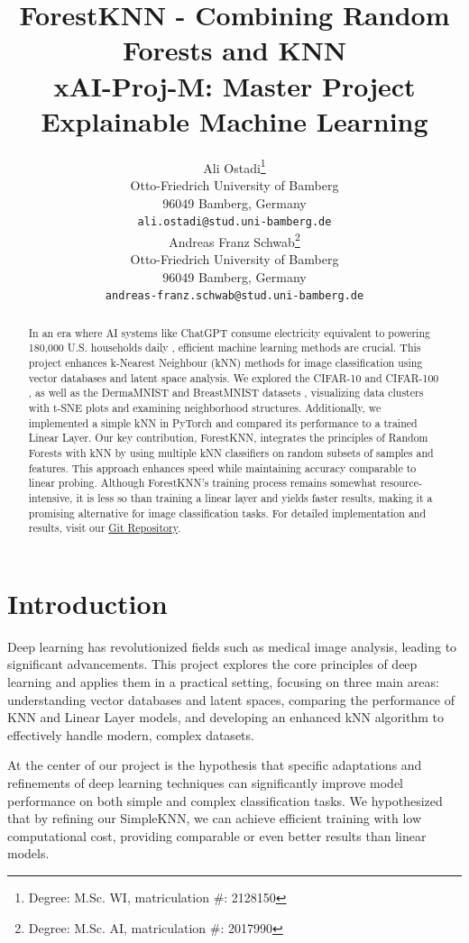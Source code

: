 \documentclass[a4paper]{article}
\title{ForestKNN - Combining Random Forests and KNN\\ {\large xAI-Proj-M: Master Project Explainable Machine Learning }}
\author{%
  Ali Ostadi\thanks{Degree: M.Sc. WI, matriculation \#: 2128150} \\
  Otto-Friedrich University of Bamberg\\
  96049 Bamberg, Germany\\
  \texttt{ali.ostadi@stud.uni-bamberg.de}\\
   \And
   Andreas Franz Schwab\thanks{Degree: M.Sc. AI, matriculation \#: 2017990}\\
   Otto-Friedrich University of Bamberg\\
   96049 Bamberg, Germany\\
   \texttt{andreas-franz.schwab@stud.uni-bamberg.de} \\
}
\begin{document}
\maketitle
\def\va{{\bm{a}}}

\begin{abstract}
In an era where AI systems like ChatGPT consume electricity equivalent to powering 180,000 U.S. households daily \citep{Gordon2024}, efficient machine learning methods are crucial. This project enhances k-Nearest Neighbour (kNN) methods for image classification using vector databases and latent space analysis. We explored the CIFAR-10 and CIFAR-100 \citep{Krizhevsky2009}, as well as the DermaMNIST and BreastMNIST datasets \citep{medmnistv1, medmnistv2}, visualizing data clusters with t-SNE plots and examining neighborhood structures. Additionally, we implemented a simple kNN in PyTorch and compared its performance to a trained Linear Layer.
Our key contribution, ForestKNN, integrates the principles of Random Forests with kNN by using multiple kNN classifiers on random subsets of samples and features. This approach enhances speed while maintaining accuracy comparable to linear probing. Although ForestKNN's training process remains somewhat resource-intensive, it is less so than training a linear layer and yields faster results, making it a promising alternative for image classification tasks.
For detailed implementation and results, visit our \href{https://github.com/git2andi/xAI_Proj_M}{Git Repository}.
  
\end{abstract}


\section{Introduction}\label{introduction}
Deep learning has revolutionized fields such as medical image analysis, leading to significant advancements. This project explores the core principles of deep learning and applies them in a practical setting, focusing on three main areas: understanding vector databases and latent spaces, comparing the performance of KNN and Linear Layer models, and developing an enhanced kNN algorithm to effectively handle modern, complex datasets.

At the center of our project is the hypothesis that specific adaptations and refinements of deep learning techniques can significantly improve model performance on both simple and complex classification tasks. We hypothesized that by refining our SimpleKNN, we can achieve efficient training with low computational cost, providing comparable or even better results than linear models.
\end{document}
